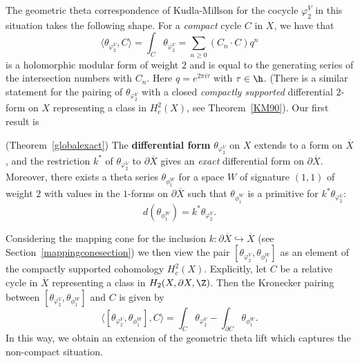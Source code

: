 The geometric theta correspondence of Kudla-Millson \cite{KM90} for
the cocycle $\varphi^V_{2}$ in this situation takes the following
shape. For a {\it compact} cycle $C$ in $X$, we have that
\begin{equation}\label{KM-id}
\langle \theta_{\varphi^V_{2}}, C \rangle =  \int_C  \theta_{\varphi^V_{2}}= \sum_{n \geq 0} (C_n \cdot C) q^n
\end{equation}
is a holomorphic modular form of weight $2$ and is equal to the
generating series of the  intersection numbers with $C_n$. Here $q
= e^{2\pi i \tau}$ with $\tau \in \h$.
(There is a similar statement for the pairing of $\theta_{\varphi^V_{2}}$
with a closed {\it compactly supported} differential $2$-form on
${X}$ representing a class in $H^2_c(X)$, see Theorem~\ref{KM90}).
Our first result is

\begin{theorem}\label{FM-boundaryexact}  (Theorem~\ref{globalexact})
The {\bf differential form} $\theta_{\varphi^V_{2}}$ on $X$ extends
to a form on $\overline{X}$, and the restriction $k^{\ast}$ of
$\theta_{\varphi^V_{2}}$ to $\partial \overline{X}$ gives an {\it
exact} differential form on $\partial\overline{X}$. Moreover, there
exists a theta series $\theta_{\phi_1^W}$ for a space $W$ of signature
$(1,1)$  of weight $2$ with values in the $1$-forms on $\partial
\overline{X}$ such that $\theta_{\phi_1^W}$ is a primitive for
$k^{\ast} \theta_{\varphi^V_{2}}$:
\[
d (\theta_{\phi_1^W}) = k^{\ast} \theta_{\varphi^V_{2}}.
\]
\end{theorem}

Considering the mapping cone for the inclusion $k: \partial
\overline{X} \hookrightarrow \overline{X}$ (see
Section~\ref{mappingconesection}) we then view the pair
$[\theta_{\varphi^V_{2}}, \theta_{\phi_1^W}]$ as an element of the
compactly supported cohomology $H^2_c(X)$. Explicitly, let $C$ be a
relative cycle in $\overline{X}$ representing a class in $H_2({X},\partial
{X},\Z)$. Then the Kronecker pairing between $[\theta_{\varphi^V_{2}},
\theta_{\phi_1^W}]$ and $C$ is given by
\begin{equation}\label{mappingconelift}
\langle [\theta_{\varphi^V_{2}}, \theta_{\phi_1^W}], C \rangle = \int_C  \theta_{\varphi^V_{2}}
 - \int_{\partial C} \theta_{\phi_1^W}.
\end{equation}
In this way, we obtain an extension of the geometric theta lift
which captures the non-compact situation.

